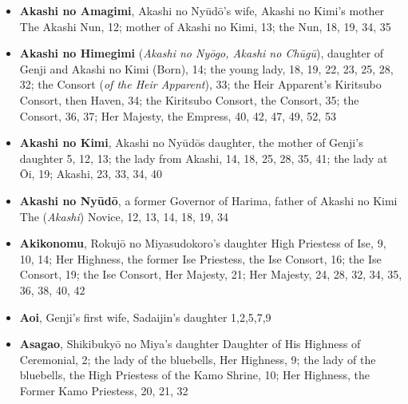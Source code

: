 \documentclass{article}
\begin{document}
\setlength{\columnsep}{5em}
\begin{multicols}{2}

	\begin{itemize}[
			label=,
			leftmargin=0em,
			rightmargin=-1.5em,
			itemindent=-2em,
			nosep,
		]

		\setlength{\itemsep}{0.25em}
		\item \textbf{Akashi no Amagimi}, Akashi no Nyūdō's wife, Akashi no Kimi's mother The Akashi Nun, 12;
		      mother of Akashi no Kimi, 13;
		      the Nun, 18, 19, 34, 35

		\item \textbf{Akashi no Himegimi} (\textit{Akashi no Nyōgo, Akashi no Chūgū}), daughter of Genji and Akashi no Kimi (Born), 14;
		      the young lady, 18, 19, 22, 23, 25, 28, 32;
		      the Consort (\textit{of the Heir Apparent}), 33;
		      the Heir Apparent's Kiritsubo Consort, then Haven, 34;
		      the Kiritsubo Consort, the Consort, 35;
		      the Consort, 36, 37;
		      Her Majesty, the Empress, 40, 42, 47, 49, 52, 53

		\item \textbf{Akashi no Kimi}, Akashi no Nyūdōs daughter, the mother of Genji's daughter 5, 12, 13;
		      the lady from Akashi, 14, 18, 25, 28, 35, 41;
		      the lady at Ōi, 19;
		      Akashi, 23, 33, 34, 40

		\item \textbf{Akashi no Nyūdō}, a former Governor of Harima, father of Akashi no Kimi The (\textit{Akashi}) Novice, 12, 13, 14, 18, 19, 34

		\item \textbf{Akikonomu}, Rokujō no Miyasudokoro's daughter High Priestess of Ise, 9, 10, 14;
		      Her Highness, the former Ise Priestess, the Ise Consort, 16;
		      the Ise Consort, 19;
		      the Ise Consort, Her Majesty, 21;
		      Her Majesty, 24, 28, 32, 34, 35, 36, 38, 40, 42

		\item \textbf{Aoi}, Genji's first wife, Sadaijin's daughter 1,2,5,7,9

		\item \textbf{Asagao}, Shikibukyō no Miya's daughter Daughter of His Highness of Ceremonial, 2;
		      the lady of the bluebells, Her Highness, 9;
		      the lady of the bluebells, the High Priestess of the Kamo Shrine, 10;
		      Her Highness, the Former Kamo Priestess, 20, 21, 32


\end{itemize}
\end{multicols}
\end{document}
